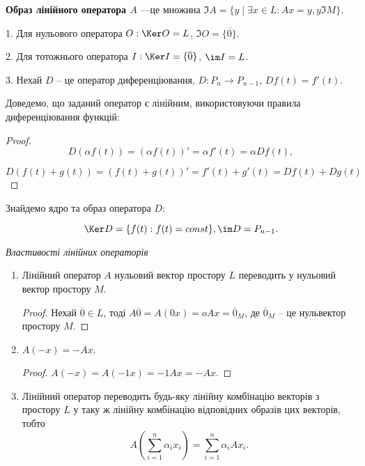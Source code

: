 \begin{definition}
	\textbf{Образ лінійного оператора $A$} ---це множина
	$\Im A = \{y \mid \exists x \in L: Ax = y, y \Im M\}$.
\end{definition}

\begin{example}
	1. Для нульового оператора $O: \Ker O = L$, $\Im O = \{\overline{0}\}$.
	
	2. Для тотожнього оператора $I: \Ker I = \{\overline{0}\}$, $\im I = L$.

	3. Нехай $D$ -- це оператор диференціювання, $D: P_n \rightarrow P_{n-1}$, $Df(t) = f'(t)$.
\end{example}

Доведемо, що заданий оператор є лінійним, використовуючи правила
диференціювання функцій: 
\begin{proof}
	$$D(\alpha f(t)) = (\alpha f(t))' = \alpha f'(t) = \alpha D f(t),$$

	$$D(f(t) + g(t)) = (f(t) + g(t))' = f'(t) + g'(t) = D f(t) + D g(t)$$
\end{proof}


Знайдемо ядро та образ оператора $D$:

$$\Ker D = \{f(t): f(t) = const\}, \im D = P_{n-1}.$$


\textit{Властивості лінійних операторів}
\begin{enumerate}
	\item Лінійний оператор $A$ нульовий вектор простору $L$ переводить у нульовий
	вектор простору $M$.
	\begin{proof}
		Нехай $\overline{0} \in L$, тоді $A\overline{0} = A(0 x) = o A x = \overline{0}_M$, де $\overline{0}_M$ -- це нульвектор простору $M$.
	\end{proof}

	\item $A(-x) = -A x$.
	\begin{proof}
		$A(-x) = A(-1x) = -1 A x = -Ax$.
	\end{proof}

	\item Лінійний оператор переводить будь-яку лінійну комбінацію векторів з
	простору $L$ у таку ж лінійну комбінацію відповідних образів цих векторів, тобто
	$$A\left( \sum\limits_{i=1}^n \alpha_i x_i \right) = \sum\limits_{i=1}^n \alpha_i A x_i.$$
\end{enumerate}


